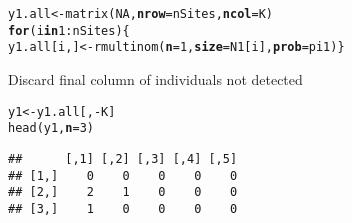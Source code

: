 \documentclass[color=usenames,dvipsnames]{beamer}\usepackage[]{graphicx}\usepackage[]{color}
\makeatletter
\newcommand{\hlnum}[1]{\textcolor[rgb]{0.69,0.494,0}{#1}}%
\newcommand{\hlopt}[1]{\textcolor[rgb]{0,0,0}{#1}}%
\newcommand{\hlstd}[1]{\textcolor[rgb]{0,0,0}{#1}}%
\newcommand{\hlkwa}[1]{\textcolor[rgb]{0,0,0}{\textbf{#1}}}%
\newcommand{\hlkwb}[1]{\textcolor[rgb]{0,0.341,0.682}{#1}}%
\newcommand{\hlkwc}[1]{\textcolor[rgb]{0,0,0}{\textbf{#1}}}%
\newcommand{\hlkwd}[1]{\textcolor[rgb]{0.004,0.004,0.506}{#1}}%
\newenvironment{kframe}{%
 \def\at@end@of@kframe{}%
 \ifinner\ifhmode%
  \def\at@end@of@kframe{\end{minipage}}%
  \begin{minipage}{\columnwidth}%
 \fi\fi%
 \def\FrameCommand##1{\hskip\@totalleftmargin \hskip-\fboxsep
 \colorbox{shadecolor}{##1}\hskip-\fboxsep
     \hskip-\linewidth \hskip-\@totalleftmargin \hskip\columnwidth}%
 \MakeFramed {\advance\hsize-\width
   \@totalleftmargin\z@ \linewidth\hsize
   \@setminipage}}%
 {\par\unskip\endMakeFramed%
 \at@end@of@kframe}
\newenvironment{knitrout}{}{} %
\makeatother
\begin{document}
\begin{frame}[fragile]
\begin{knitrout}
\begin{kframe}
\begin{alltt}
\hlstd{y1.all} \hlkwb{<-} \hlkwd{matrix}\hlstd{(}\hlnum{NA}\hlstd{,} \hlkwc{nrow}\hlstd{=nSites,} \hlkwc{ncol}\hlstd{=K)}
\hlkwa{for}\hlstd{(i} \hlkwa{in} \hlnum{1}\hlopt{:}\hlstd{nSites) \{}
    \hlstd{y1.all[i,]} \hlkwb{<-} \hlkwd{rmultinom}\hlstd{(}\hlkwc{n}\hlstd{=}\hlnum{1}\hlstd{,} \hlkwc{size}\hlstd{=N1[i],} \hlkwc{prob}\hlstd{=pi1)    \}}
\end{alltt}
\end{kframe}
\end{knitrout}
  \pause
  \vfill
  Discard final column of individuals not detected
\begin{knitrout}\scriptsize
{}\color{fgcolor}\begin{kframe}
\begin{alltt}
\hlstd{y1} \hlkwb{<-} \hlstd{y1.all[,}\hlopt{-}\hlstd{K]}
\hlkwd{head}\hlstd{(y1,} \hlkwc{n}\hlstd{=}\hlnum{3}\hlstd{)}
\end{alltt}
\begin{verbatim}
##      [,1] [,2] [,3] [,4] [,5]
## [1,]    0    0    0    0    0
## [2,]    2    1    0    0    0
## [3,]    1    0    0    0    0
\end{verbatim}
\end{kframe}
\end{knitrout}
\end{frame}
\end{document}
